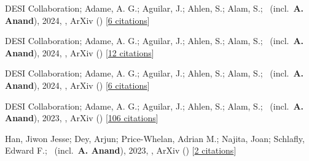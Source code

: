 \item[{\color{numcolor}\scriptsize5}] DESI Collaboration; Adame, A. G.; Aguilar, J.; Ahlen, S.; Alam, S.; \etal\ (incl.\ \textbf{A. Anand}), 2024, , ArXiv () [\href{https://ui.adsabs.harvard.edu/abs/2024arXiv240403000D}{6 citations}]

\item[{\color{numcolor}\scriptsize4}] DESI Collaboration; Adame, A. G.; Aguilar, J.; Ahlen, S.; Alam, S.; \etal\ (incl.\ \textbf{A. Anand}), 2024, , ArXiv () [\href{https://ui.adsabs.harvard.edu/abs/2024arXiv240403002D}{12 citations}]

\item[{\color{numcolor}\scriptsize3}] DESI Collaboration; Adame, A. G.; Aguilar, J.; Ahlen, S.; Alam, S.; \etal\ (incl.\ \textbf{A. Anand}), 2024, , ArXiv () [\href{https://ui.adsabs.harvard.edu/abs/2024arXiv240403001D}{6 citations}]

\item[{\color{numcolor}\scriptsize2}] DESI Collaboration; Adame, A. G.; Aguilar, J.; Ahlen, S.; Alam, S.; \etal\ (incl.\ \textbf{A. Anand}), 2023, , ArXiv () [\href{https://ui.adsabs.harvard.edu/abs/2023arXiv230606308D}{106 citations}]

\item[{\color{numcolor}\scriptsize1}] Han, Jiwon Jesse; Dey, Arjun; Price-Whelan, Adrian M.; Najita, Joan; Schlafly, Edward F.; \etal\ (incl.\ \textbf{A. Anand}), 2023, , ArXiv () [\href{https://ui.adsabs.harvard.edu/abs/2023arXiv230611784H}{2 citations}]